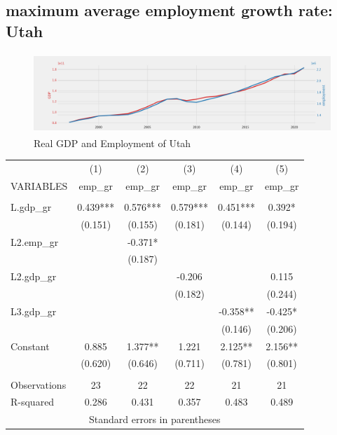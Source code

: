 \documentclass{article}
\begin{document}
\newpage

\subsection{maximum average employment growth rate: Utah}
\begin{figure}[h]
	\centering
	\includegraphics[width=12cm, height=3cm]{res/ut.png}
	\caption{Real GDP and Employment of Utah}
\end{figure}

\begin{center}
\resizebox{9cm}{!}
{
    \begin{tabular}{lccccc} \hline
    & (1) & (2) & (3) & (4) & (5) \\
    VARIABLES & emp\_gr & emp\_gr & emp\_gr & emp\_gr & emp\_gr \\ \hline
    &  &  &  &  &  \\
    L.gdp\_gr & 0.439*** & 0.576*** & 0.579*** & 0.451*** & 0.392* \\
    & (0.151) & (0.155) & (0.181) & (0.144) & (0.194) \\
    L2.emp\_gr &  & -0.371* &  &  &  \\
    &  & (0.187) &  &  &  \\
    L2.gdp\_gr &  &  & -0.206 &  & 0.115 \\
    &  &  & (0.182) &  & (0.244) \\
    L3.gdp\_gr &  &  &  & -0.358** & -0.425* \\
    &  &  &  & (0.146) & (0.206) \\
    Constant & 0.885 & 1.377** & 1.221 & 2.125** & 2.156** \\
    & (0.620) & (0.646) & (0.711) & (0.781) & (0.801) \\
    &  &  &  &  &  \\
    Observations & 23 & 22 & 22 & 21 & 21 \\
    R-squared & 0.286 & 0.431 & 0.357 & 0.483 & 0.489 \\ \hline
    \multicolumn{6}{c}{ Standard errors in parentheses} \\
\end{tabular}
}
\end{center}
\end{document}
